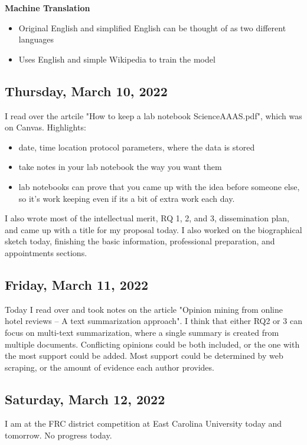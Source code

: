 \documentclass[11pt,letterpaper]{article}
\begin{document}
\textbf{Machine Translation}
\begin{itemize}
    \item Original English and simplified English can be thought of as two different languages
    \item Uses English and simple Wikipedia to train the model
\end{itemize}

\subsection{Thursday, March 10, 2022}
I read over the artcile "How to keep a lab notebook ScienceAAAS.pdf", which was on Canvas. Highlights:
\begin{itemize}
    \item date, time location protocol parameters, where the data is stored
    \item take notes in your lab notebook the way you want them
    \item lab notebooks can prove that you came up with the idea before someone else, so it's work keeping even if its a bit of extra work each day.
\end{itemize}

I also wrote most of the intellectual merit, RQ 1, 2, and 3, dissemination plan, and came up with a title for my proposal today. I also worked on the biographical sketch today, finishing the basic information, professional preparation, and appointments sections.

\subsection{Friday, March 11, 2022}
Today I read over and took notes on the article "Opinion mining from online hotel reviews – A text summarization approach". I think that either RQ2 or 3 can focus on multi-text summarization, where a single summary is created from multiple documents. Conflicting opinions could be both included, or the one with the most support could be added. Most support could be determined by web scraping, or the amount of evidence each author provides.

\subsection{Saturday, March 12, 2022}
I am at the FRC district competition at East Carolina University today and tomorrow. No progress today.
\end{document}
